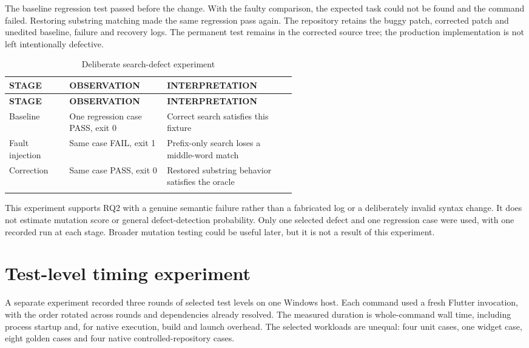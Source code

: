 \documentclass[12pt,a4paper,oneside]{report}
\begin{document}
The baseline regression test passed before the change. With the faulty comparison, the expected task could not be found and the command failed. Restoring substring matching made the same regression pass again. The repository retains the buggy patch, corrected patch and unedited baseline, failure and recovery logs. The permanent test remains in the corrected source tree; the production implementation is not left intentionally defective.

{\fontsize{11}{14}\selectfont\setlength{\tabcolsep}{4pt}\renewcommand{\arraystretch}{1.15}
\begin{longtable}{@{}>{\raggedright\arraybackslash}p{0.21\linewidth}>{\raggedright\arraybackslash}p{0.34\linewidth}>{\raggedright\arraybackslash}p{}@{}}
\caption{Deliberate search-defect experiment}\\\toprule
\textbf{STAGE} & \textbf{OBSERVATION} & \textbf{INTERPRETATION} \\ \midrule
\endfirsthead\toprule
\textbf{STAGE} & \textbf{OBSERVATION} & \textbf{INTERPRETATION} \\ \midrule
\endhead
Baseline & One regression case PASS, exit 0 & Correct search satisfies this fixture \\ \addlinespace[5pt]
Fault injection & Same case FAIL, exit 1 & Prefix-only search loses a middle-word match \\ \addlinespace[5pt]
Correction & Same case PASS, exit 0 & Restored substring behavior satisfies the oracle \\ \addlinespace[5pt]
\bottomrule\end{longtable}}
This experiment supports RQ2 with a genuine semantic failure rather than a fabricated log or a deliberately invalid syntax change. It does not estimate mutation score or general defect-detection probability. Only one selected defect and one regression case were used, with one recorded run at each stage. Broader mutation testing could be useful later, but it is not a result of this experiment.

\section{Test-level timing experiment}
A separate experiment recorded three rounds of selected test levels on one Windows host. Each command used a fresh Flutter invocation, with the order rotated across rounds and dependencies already resolved. The measured duration is whole-command wall time, including process startup and, for native execution, build and launch overhead. The selected workloads are unequal: four unit cases, one widget case, eight golden cases and four native controlled-repository cases.
\end{document}
